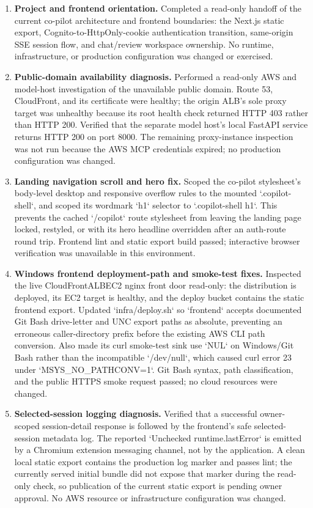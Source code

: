 \begin{enumerate}
  \item \textbf{Project and frontend orientation.} Completed a read-only handoff of the current co-pilot architecture and frontend boundaries: the Next.js static export, Cognito-to-HttpOnly-cookie authentication transition, same-origin SSE session flow, and chat/review workspace ownership. No runtime, infrastructure, or production configuration was changed or exercised.

  \item \textbf{Public-domain availability diagnosis.} Performed a read-only AWS and model-host investigation of the unavailable public domain. Route 53, CloudFront, and its certificate were healthy; the origin ALB's sole proxy target was unhealthy because its root health check returned HTTP 403 rather than HTTP 200. Verified that the separate model host's local FastAPI service returns HTTP 200 on port 8000. The remaining proxy-instance inspection was not run because the AWS MCP credentials expired; no production configuration was changed.

  \item \textbf{Landing navigation scroll and hero fix.} Scoped the co-pilot stylesheet's body-level desktop and responsive overflow rules to the mounted `.copilot-shell`, and scoped its wordmark `h1` selector to `.copilot-shell h1`. This prevents the cached `/copilot` route stylesheet from leaving the landing page locked, restyled, or with its hero headline overridden after an auth-route round trip. Frontend lint and static export build passed; interactive browser verification was unavailable in this environment.

  \item \textbf{Windows frontend deployment-path and smoke-test fixes.} Inspected the live CloudFront\textrightarrow ALB\textrightarrow EC2 nginx front door read-only: the distribution is deployed, its EC2 target is healthy, and the deploy bucket contains the static frontend export. Updated `infra/deploy.sh` so `frontend` accepts documented Git Bash drive-letter and UNC export paths as absolute, preventing an erroneous caller-directory prefix before the existing AWS CLI path conversion. Also made its curl smoke-test sink use `NUL` on Windows/Git Bash rather than the incompatible `/dev/null`, which caused curl error 23 under `MSYS_NO_PATHCONV=1`. Git Bash syntax, path classification, and the public HTTPS smoke request passed; no cloud resources were changed.

  \item \textbf{Selected-session logging diagnosis.} Verified that a successful owner-scoped session-detail response is followed by the frontend's safe selected-session metadata log. The reported `Unchecked runtime.lastError` is emitted by a Chromium extension messaging channel, not by the application. A clean local static export contains the production log marker and passes lint; the currently served initial bundle did not expose that marker during the read-only check, so publication of the current static export is pending owner approval. No AWS resource or infrastructure configuration was changed.


\end{enumerate}
